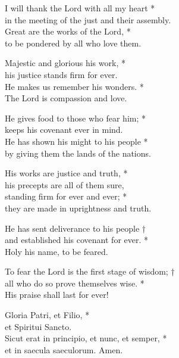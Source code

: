 
I will thank the Lord with all my heart *\\
in the meeting of the just and their assembly.\\
Great are the works of the Lord, *\\
to be pondered by all who love them.

Majestic and glorious his work, *\\
his justice stands firm for ever.\\
He makes us remember his wonders. *\\
The Lord is compassion and love.

He gives food to those who fear him; *\\
keeps his covenant ever in mind.\\
He has shown his might to his people *\\
by giving them the lands of the nations.

His works are justice and truth, *\\
his precepts are all of them sure,\\
standing firm for ever and ever; *\\
they are made in uprightness and truth.

He has sent deliverance to his people †\\
and established his covenant for ever. *\\
Holy his name, to be feared.

To fear the Lord is the first stage of wisdom; †\\
all who do so prove themselves wise. *\\
His praise shall last for ever!

Gloria Patri, et Filio, *\\
et Spiritui Sancto. \\
Sicut erat in principio, et nunc, et semper, *\\
et in saecula saeculorum. Amen.\\    

